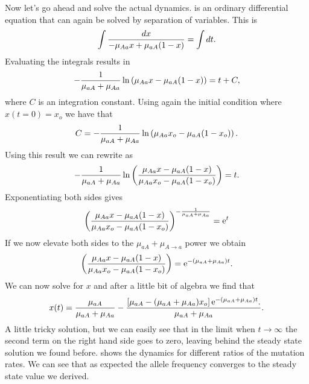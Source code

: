 Now let's go ahead and solve the actual dynamics.  is an
ordinary differential equation that can again be solved by separation of
variables. This is
\begin{equation}
  \int {dx \over - \mu_{A a} x + \mu_{a A} (1 - x)} = 
  \int dt.
\end{equation}
Evaluating the integrals results in
\begin{equation}
  -{1 \over \mu_{a A} + \mu_{A a}}
  \ln \left( \mu_{A a} x - \mu_{a A} (1 - x) \right) =
  t + C,
  \label{eq_mutation_int}
\end{equation}
where $C$ is an integration constant. Using again the initial condition where
$x(t=0) = x_o$ we have that
\begin{equation}
  C =  -{1 \over \mu_{a A} + \mu_{A a}}
  \ln \left( \mu_{A a} x_o - \mu_{a A} (1 - x_o) \right).
\end{equation}
Using this result we can rewrite  as
\begin{equation}
  -{1 \over \mu_{a A} + \mu_{A a}}
  \ln \left( { \mu_{A a} x - \mu_{a A} (1 - x)
    \over
  \mu_{A a} x_o - \mu_{a A} (1 - x_o)} \right) = t.
\end{equation}
Exponentiating both sides gives
\begin{equation}
  \left( { \mu_{A a} x - \mu_{a A} (1 - x)
    \over
  \mu_{A a} x_o - \mu_{a A} (1 - x_o)} \right)^{
    -{1 \over \mu_{a A} + \mu_{A a}}} = \mathrm{e}^t
\end{equation}
If we now elevate both sides to the $\mu_{a A} + \mu_{A\rightarrow
a}$ power we obtain
\begin{equation}
  \left( { \mu_{A a} x - \mu_{a A} (1 - x)
    \over
  \mu_{A a} x_o - \mu_{a A} (1 - x_o)} \right) =
  \mathrm{e}^{- (\mu_{a A} + \mu_{A a}) t}.
\end{equation}
We can now solve for $x$ and after a little bit of algebra we find that
\begin{equation}
  x(t) = {\mu_{a A} 
  \over 
  \mu_{a A} + \mu_{A a}} -
  {\left[  
  \mu_{a A} -
  (\mu_{a A} + \mu_{A a}) x_o
  \right] 
  \mathrm{e}^{- (\mu_{a A} + \mu_{A a}) t}.
  \over
  \mu_{a A} + \mu_{A a}}.
\end{equation}
A little tricky solution, but we can easily see that in the limit when $t
\rightarrow \infty$ the second term on the right hand side goes to zero,
leaving behind the steady state solution we found before.
 shows the dynamics for different ratios of the
mutation rates. We can see that as expected the allele frequency converges to
the steady state value we derived.

